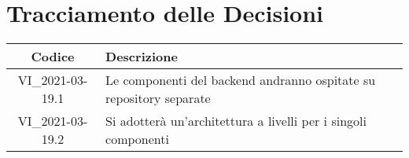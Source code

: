 \section*{Tracciamento delle Decisioni}

\begin{center}
	\begin{longtable}{|c|p{13cm}|}
	\hline
	\rowcolor{lighter-grayer}
	\textbf{Codice} & \textbf{Descrizione} \\
	\hline
	\endfirsthead
	
	\hline
	VI\_2021-03-19.1 & Le componenti del backend andranno ospitate su repository separate \\
	VI\_2021-03-19.2 & Si adotterà un'architettura a livelli per i singoli componenti \\
	\hline

	\end{longtable}
\end{center}
